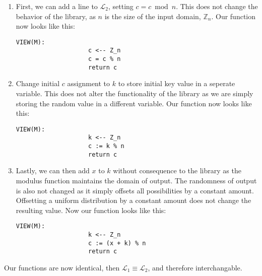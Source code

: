 \documentclass[10pt,letterpaper]{article}
\begin{document}
	\begin{enumerate}
		\item First, we can add a line to $\mathcal{L}_2$, setting
			$c = c \bmod n$. This does not change the behavior of
			the library, as $n$ is the size of the input domain,
			$\mathbb{Z}_n$. Our function now looks like this:
			\begin{lstlisting}[frame=none]
				VIEW(M):
					c <-- Z_n
					c = c % n
					return c
			\end{lstlisting}

		\item Change initial $c$ assignment to $k$ to store initial
			key value in a seperate variable. This does not alter
			the functionality of the library as we are simply
			storing the random value in a different variable. 
			Our function now looks like this:
			\begin{lstlisting}[frame=none]
				VIEW(M):
					k <-- Z_n
					c := k % n
					return c
			\end{lstlisting}
		\item Lastly, we can then add $x$ to $k$ without consequence
			to the library as the modulus function maintains the
			domain of output. The randomness of output is also not
			changed as it simply offsets all possibilities by a 
			constant amount. Offsetting a uniform distribution by
			a constant amount does not change the resulting value.
			Now our function looks like this:
			\begin{lstlisting}[frame=none]
				VIEW(M):
					k <-- Z_n
					c := (x + k) % n
					return c
			\end{lstlisting}
	\end{enumerate}

	Our functions are now identical, then $\mathcal{L}_1 \equiv 
	\mathcal{L}_2$, and therefore interchangable.
\end{document}
